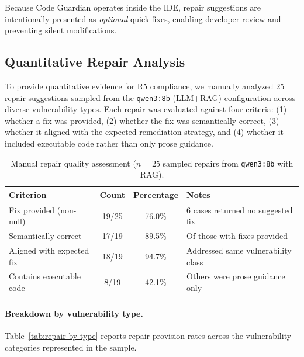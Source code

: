 Because Code Guardian operates inside the IDE, repair suggestions are intentionally presented as \emph{optional} quick fixes, enabling developer review and preventing silent modifications.

\subsection*{Quantitative Repair Analysis}

To provide quantitative evidence for R5 compliance, we manually analyzed 25 repair suggestions sampled from the \texttt{qwen3:8b} (LLM+RAG) configuration across diverse vulnerability types. Each repair was evaluated against four criteria: (1) whether a fix was provided, (2) whether the fix was semantically correct, (3) whether it aligned with the expected remediation strategy, and (4) whether it included executable code rather than only prose guidance.

\begin{table}[H]
  \centering
  \caption{Manual repair quality assessment ($n=25$ sampled repairs from \texttt{qwen3:8b} with RAG).}
  \label{tab:repair-quality}
  \footnotesize
  \renewcommand{\arraystretch}{1.15}
  \begin{tabular}{p{}ccp{}}
    \toprule
    Criterion & Count & Percentage & Notes \\
    \midrule
    Fix provided (non-null) & 19/25 & 76.0\% & 6 cases returned no suggested fix \\
    Semantically correct & 17/19 & 89.5\% & Of those with fixes provided \\
    Aligned with expected fix & 18/19 & 94.7\% & Addressed same vulnerability class \\
    Contains executable code & 8/19 & 42.1\% & Others were prose guidance only \\
    \bottomrule
  \end{tabular}
\end{table}

\paragraph{Breakdown by vulnerability type.}
Table~\ref{tab:repair-by-type} reports repair provision rates across the vulnerability categories represented in the sample.

